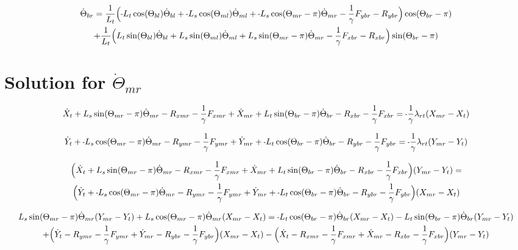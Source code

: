 \documentclass[11pt, landscape]{article}
\newcommand{\mn}{\scalebox{0.7}[1.0]{-}}
\begin{document}
\begin{multline}
\dot{\Theta}_{br} =
\frac{1}{L_{t}}\Big(\mn L_{t}\cos(\Theta_{bl})\dot{\Theta}_{bl} + \mn L_{s}\cos(\Theta_{ml})\dot{\Theta}_{ml} + \mn L_{s}\cos(\Theta_{mr}-\pi)\dot{\Theta}_{mr} - \frac{1}{\gamma}F_{ybr} - R_{ybr} \Big)\cos(\Theta_{br}-\pi) \\
+ \frac{1}{L_{t}}\Big(L_{t}\sin(\Theta_{bl})\dot{\Theta}_{bl} + L_{s}\sin(\Theta_{ml})\dot{\Theta}_{ml} + L_{s}\sin(\Theta_{mr}-\pi)\dot{\Theta}_{mr} - \frac{1}{\gamma}F_{xbr} - R_{xbr} \Big)\sin(\Theta_{br}-\pi)
\end{multline}


\section{Solution for $\dot{\Theta}_{mr}$}

\begin{equation}
\dot{X}_{t } + L_{s}\sin(\Theta_{mr}-\pi)  \dot{\Theta}_{mr} - R_{xmr} - \frac{1}{\gamma}F_{xmr} + 
\dot{X}_{mr} + L_{t}\sin(\Theta_{br}-\pi)  \dot{\Theta}_{br} - R_{xbr} - \frac{1}{\gamma}F_{xbr} = \mn\frac{1}{\gamma}\lambda_{rt}(X_{mr} - X_{t })
\end{equation}

\begin{equation}
\dot{Y}_{t } + \mn L_{s}\cos(\Theta_{mr}-\pi)  \dot{\Theta}_{mr} - R_{ymr} - \frac{1}{\gamma}F_{ymr} +
\dot{Y}_{mr} + \mn L_{t}\cos(\Theta_{br}-\pi)  \dot{\Theta}_{br} - R_{ybr} - \frac{1}{\gamma}F_{ybr} = \mn\frac{1}{\gamma}\lambda_{rt}(Y_{mr} - Y_{t })
\end{equation}

\begin{multline}
\Big ( \dot{X}_{t } + L_{s}\sin(\Theta_{mr}-\pi)  \dot{\Theta}_{mr} - R_{xmr} - \frac{1}{\gamma}F_{xmr} 
+ \dot{X}_{mr} + L_{t}\sin(\Theta_{br}-\pi)  \dot{\Theta}_{br} - R_{xbr} - \frac{1}{\gamma}F_{xbr} \Big ) (Y_{mr} - Y_{t }) = \\
\Big ( \dot{Y}_{t } + \mn L_{s}\cos(\Theta_{mr}-\pi)  \dot{\Theta}_{mr} - R_{ymr} - \frac{1}{\gamma}F_{ymr}
+ \dot{Y}_{mr} + \mn L_{t}\cos(\Theta_{br}-\pi)  \dot{\Theta}_{br} - R_{ybr} - \frac{1}{\gamma}F_{ybr} \Big ) (X_{mr} - X_{t })
\end{multline}

\begin{multline}
L_{s}\sin(\Theta_{mr}-\pi) \dot{\Theta}_{mr} (Y_{mr} - Y_{t }) + L_{s}\cos(\Theta_{mr}-\pi) \dot{\Theta}_{mr} (X_{mr} - X_{t }) =
\mn L_{t}\cos(\Theta_{br}-\pi) \dot{\Theta}_{br} (X_{mr} - X_{t }) - L_{t}\sin(\Theta_{br}-\pi) \dot{\Theta}_{br} (Y_{mr} - Y_{t }) \\
+ \Big ( \dot{Y}_{t } - R_{ymr} - \frac{1}{\gamma}F_{ymr} + \dot{Y}_{mr} - R_{ybr} - \frac{1}{\gamma}F_{ybr} \Big ) (X_{mr} - X_{t }) 
- \Big ( \dot{X}_{t } - R_{xmr} - \frac{1}{\gamma}F_{xmr} + \dot{X}_{mr} - R_{xbr} - \frac{1}{\gamma}F_{xbr} \Big ) (Y_{mr} - Y_{t })
\end{multline}
\end{document}

